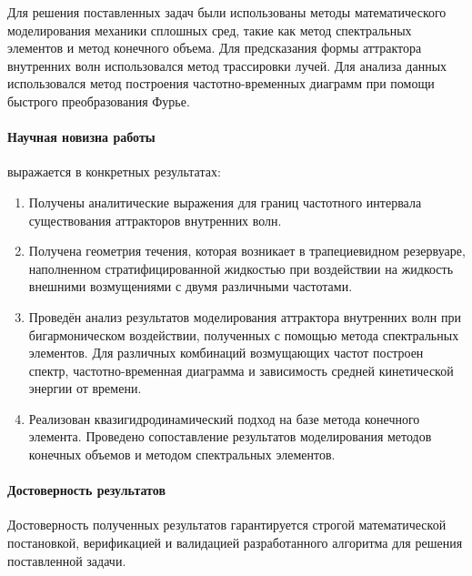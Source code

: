\documentclass[utf8x]{G7-32} %
\begin{document}
Для решения поставленных задач были использованы методы математического моделирования механики сплошных сред, такие как метод спектральных элементов и метод конечного объема. Для предсказания формы аттрактора внутренних волн использовался метод трассировки лучей. Для анализа данных использовался метод построения частотно-временных диаграмм при помощи быстрого преобразования Фурье.

\paragraph{Научная новизна работы} выражается в конкретных результатах:
\begin{enumerate}[1.]
  \item Получены аналитические выражения для границ частотного интервала существования аттракторов внутренних волн.%
    
  \item Получена геометрия течения, которая возникает в трапециевидном резервуаре, наполненном стратифицированной жидкостью при воздействии на жидкость внешними возмущениями с двумя различными частотами. 
    
  \item Проведён анализ результатов моделирования аттрактора внутренних волн при бигармоническом воздействии, полученных с помощью метода спектральных элементов. Для различных комбинаций возмущающих частот построен спектр, частотно-временная диаграмма и зависимость средней кинетической энергии от времени. 
    
  \item Реализован квазигидродинамический подход на базе метода конечного элемента. Проведено сопоставление результатов моделирования методов конечных объемов и методом спектральных элементов.
\end{enumerate}

\paragraph{Достоверность результатов}

Достоверность полученных результатов гарантируется строгой математической постановкой, верификацией и валидацией разработанного алгоритма для решения поставленной задачи.

\end{document}
